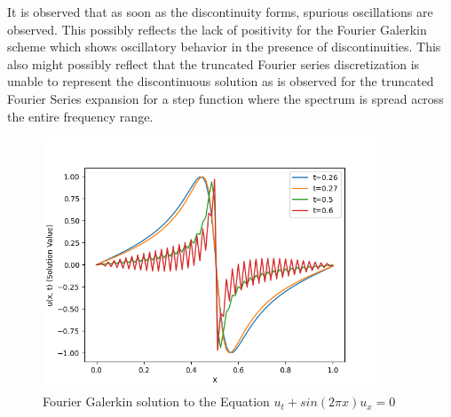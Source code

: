 \documentclass[12pt]{article}
\begin{document}
It is observed that as soon as the discontinuity forms, spurious oscillations are observed. This possibly reflects the lack of positivity for the Fourier Galerkin scheme which shows oscillatory behavior in the presence of discontinuities. This also might possibly reflect that the truncated Fourier series discretization is unable to represent the discontinuous solution as is observed for the truncated Fourier Series expansion for a step function where the spectrum is spread across the entire frequency range.
\begin{figure}
    \centering
    \includegraphics[width=10cm]{uxplot_Q1.png}
    \caption{Fourier Galerkin solution to the Equation $u_t + sin(2 \pi x)u_x = 0$}
    \label{fig:app:uxplot}
\end{figure}
\end{document}
